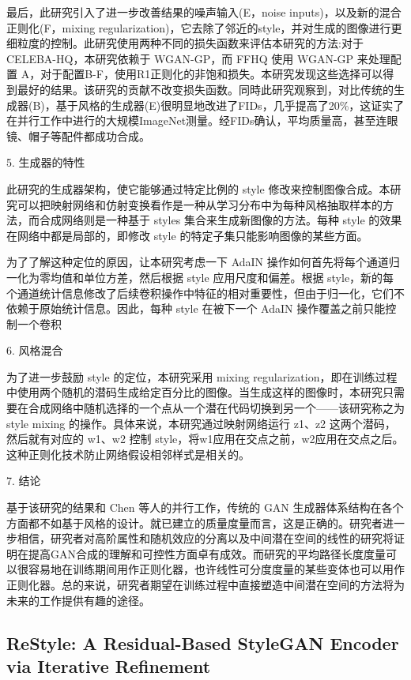 最后，此研究引入了进一步改善结果的噪声输入(E，noise inputs)，以及新的混合正则化(F，mixing regularization)，它去除了邻近的style，并对生成的图像进行更细粒度的控制。此研究使用两种不同的损失函数来评估本研究的方法:对于CELEBA-HQ，本研究依赖于 WGAN-GP，而 FFHQ 使用 WGAN-GP 来处理配置 A，对于配置B-F，使用R1正则化的非饱和损失。本研究发现这些选择可以得到最好的结果。该研究的贡献不改变损失函数。同時此研究观察到，对比传统的生成器(B)，基于风格的生成器(E)很明显地改进了FIDs，几乎提高了20\%，这证实了在并行工作中进行的大规模ImageNet测量。经FIDs确认，平均质量高，甚至连眼镜、帽子等配件都成功合成。

5. 生成器的特性

此研究的生成器架构，使它能够通过特定比例的 style 修改来控制图像合成。本研究可以把映射网络和仿射变换看作是一种从学习分布中为每种风格抽取样本的方法，而合成网络则是一种基于 styles 集合来生成新图像的方法。每种 style 的效果在网络中都是局部的，即修改 style 的特定子集只能影响图像的某些方面。

为了了解这种定位的原因，让本研究考虑一下 AdaIN 操作如何首先将每个通道归一化为零均值和单位方差，然后根据 style 应用尺度和偏差。根据 style，新的每个通道统计信息修改了后续卷积操作中特征的相对重要性，但由于归一化，它们不依赖于原始统计信息。因此，每种 style 在被下一个 AdaIN 操作覆盖之前只能控制一个卷积

6. 风格混合

为了进一步鼓励 style 的定位，本研究采用 mixing regularization，即在训练过程中使用两个随机的潜码生成给定百分比的图像。当生成这样的图像时，本研究只需要在合成网络中随机选择的一个点从一个潜在代码切换到另一个——该研究称之为 style mixing 的操作。具体来说，本研究通过映射网络运行 z1、z2 这两个潜码，然后就有对应的 w1、w2 控制 style，将w1应用在交点之前，w2应用在交点之后。这种正则化技术防止网络假设相邻样式是相关的。

7. 结论

基于该研究的结果和 Chen 等人的并行工作，传统的 GAN 生成器体系结构在各个方面都不如基于风格的设计。就已建立的质量度量而言，这是正确的。研究者进一步相信，研究者对高阶属性和随机效应的分离以及中间潜在空间的线性的研究将证明在提高GAN合成的理解和可控性方面卓有成效。而研究的平均路径长度度量可以很容易地在训练期间用作正则化器，也许线性可分度度量的某些变体也可以用作正则化器。总的来说，研究者期望在训练过程中直接塑造中间潜在空间的方法将为未来的工作提供有趣的途径。

\subsection{ReStyle: A Residual-Based StyleGAN Encoder via Iterative Refinement}

